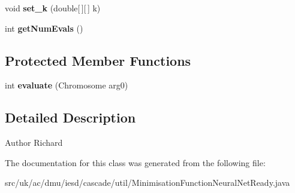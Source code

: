 \begin{DoxyCompactItemize}
\item 
\hypertarget{classuk_1_1ac_1_1dmu_1_1iesd_1_1cascade_1_1util_1_1_minimisation_function_neural_net_ready_a0e785bc134477fbb9ccf8bb64bb476e4}{void {\bfseries set\-\_\-k} (double\mbox{[}$\,$\mbox{]}\mbox{[}$\,$\mbox{]} k)}\label{classuk_1_1ac_1_1dmu_1_1iesd_1_1cascade_1_1util_1_1_minimisation_function_neural_net_ready_a0e785bc134477fbb9ccf8bb64bb476e4}

\item 
\hypertarget{classuk_1_1ac_1_1dmu_1_1iesd_1_1cascade_1_1util_1_1_minimisation_function_neural_net_ready_a4bcb854ed81a01b29e6dc6dc6bd80acf}{int {\bfseries get\-Num\-Evals} ()}\label{classuk_1_1ac_1_1dmu_1_1iesd_1_1cascade_1_1util_1_1_minimisation_function_neural_net_ready_a4bcb854ed81a01b29e6dc6dc6bd80acf}

\end{DoxyCompactItemize}
\subsection*{Protected Member Functions}
\begin{DoxyCompactItemize}
\item 
\hypertarget{classuk_1_1ac_1_1dmu_1_1iesd_1_1cascade_1_1util_1_1_minimisation_function_neural_net_ready_a3c9ab79d7d3323a47de794c612a0d0af}{int {\bfseries evaluate} (Chromosome arg0)}\label{classuk_1_1ac_1_1dmu_1_1iesd_1_1cascade_1_1util_1_1_minimisation_function_neural_net_ready_a3c9ab79d7d3323a47de794c612a0d0af}

\end{DoxyCompactItemize}


\subsection{Detailed Description}
\begin{DoxyAuthor}{Author}
Richard 
\end{DoxyAuthor}


The documentation for this class was generated from the following file\-:\begin{DoxyCompactItemize}
\item 
src/uk/ac/dmu/iesd/cascade/util/Minimisation\-Function\-Neural\-Net\-Ready.\-java\end{DoxyCompactItemize}
